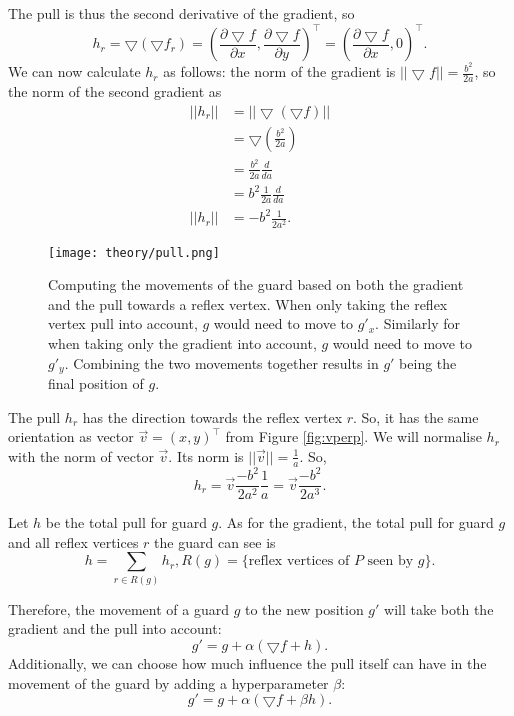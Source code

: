 The pull is thus the second derivative of the gradient, so $$h_r = \bigtriangledown (\bigtriangledown f_r) = \left(\frac{\partial \bigtriangledown f}{\partial x}, \frac{\partial \bigtriangledown f}{\partial y}\right)^\intercal = \left(\frac{\partial \bigtriangledown f}{\partial x}, 0\right)^\intercal.$$  We can now calculate $h_r$ as follows: the norm of the gradient is $||\bigtriangledown f|| = \frac{b^2}{2a}$, so the norm of the second gradient as 
\begin{align*}
||h_r||&= ||\bigtriangledown (\bigtriangledown f)|| \\
       &= \bigtriangledown (\frac{b^2}{2a}) \\
       &= \frac{b^2}{2a}\frac{d}{da} \\
       &= b^2\frac{1}{2a}\frac{d}{da} \\
||h_r||&= -b^2\frac{1}{2a^2}.
\end{align*}

\begin{figure*}[!h]
    \texttt{[image: theory/pull.png]}
    \centering
    \caption{Computing the movements of the guard based on both the gradient and the pull towards a reflex vertex. When only taking the reflex vertex pull into account, $g$ would need to move to $g'_x$. Similarly for when taking only the gradient into account, $g$ would need to move to $g'_y$. Combining the two movements together results in $g'$ being the final position of $g$.}
    \label{fig:pull}
\end{figure*}

The pull $h_r$ has the direction towards the reflex vertex $r$. So, it has the same orientation as vector $\vec{v} = (x, y)^\intercal$  from Figure \ref{fig:vperp}. We will normalise $h_r$ with the norm of vector $\vec{v}$. Its norm is $||\vec{v}|| = \frac 1 a$. So, $$h_r = \vec{v}\frac{-b^2}{2a^2}\frac 1 a = \vec{v}\frac{-b^2}{2a^3}.$$

Let $h$ be the total pull for guard $g$. As for the gradient, the total pull for guard $g$ and all reflex vertices $r$ the guard can see is $$h = \sum_{r \in R(g)} h_r, R(g) = \{\text{reflex vertices of $P$ seen by $g$\}}.$$

Therefore, the movement of a guard $g$ to the new position $g'$ will take both the gradient and the pull into account: $$g' = g + \alpha (\bigtriangledown f + h).$$ Additionally, we can choose how much influence the pull itself can have in the movement of the guard by adding a hyperparameter $\beta$: $$g' = g + \alpha (\bigtriangledown f + \beta h).$$

